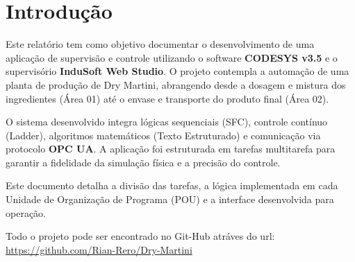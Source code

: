 \section{Introdução}\label{sec:introducao}

Este relatório tem como objetivo documentar o desenvolvimento de uma aplicação de supervisão e controle utilizando o software \textbf{CODESYS v3.5}\cite{codesysV35SP21} e o supervisório \textbf{InduSoft Web Studio}. O projeto contempla a automação de uma planta de produção de Dry Martini, abrangendo desde a dosagem e mistura dos ingredientes (Área 01) até o envase e transporte do produto final (Área 02).

O sistema desenvolvido integra lógicas sequenciais (SFC), controle contínuo (Ladder), algoritmos matemáticos (Texto Estruturado) e comunicação via protocolo \textbf{OPC UA}. A aplicação foi estruturada em tarefas multitarefa para garantir a fidelidade da simulação física e a precisão do controle.

Este documento detalha a divisão das tarefas, a lógica implementada em cada Unidade de Organização de Programa (POU) e a interface desenvolvida para operação.

Todo o projeto pode ser encontrado no Git-Hub atráves do url:  \url{https://github.com/Rian-Rero/Dry-Martini}\cite{dryMartiniRepo}
